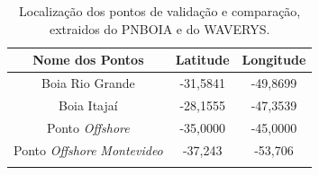 \begin{table}[H]
\centering
\begin{longtable}{ccc}
\caption[Localização dos pontos de validação e comparação]{Localização dos pontos de validação e comparação, extraidos do PNBOIA e do WAVERYS.}\\
\hline
\textbf{Nome dos Pontos}  & \textbf{Latitude} & \textbf{Longitude} \\ \hline
Boia Rio Grande           & -31,5841          & -49,8699           \\
Boia Itajaí               & -28,1555          & -47,3539           \\
Ponto \textit{Offshore}            & -35,0000          & -45,0000           \\
Ponto \textit{Offshore} \textit{Montevideo} & -37,243           & -53,706       \\
\hline
\label{tab:pontos}
\end{longtable}
\end{table}




